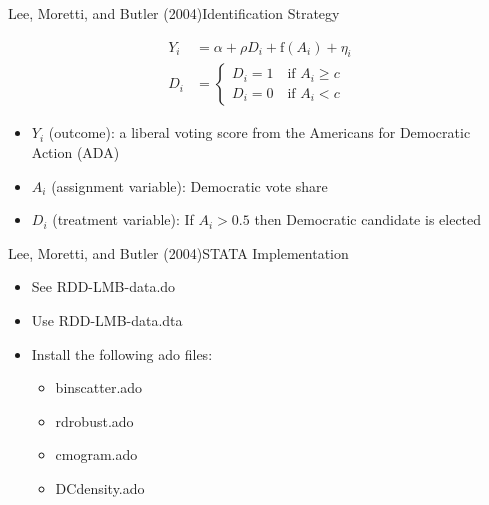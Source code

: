 \documentclass[hyperref={pdfpagelabels=false}]{beamer}
\begin{document}
\begin{frame}{Lee, Moretti, and Butler (2004)}{Identification Strategy}
	
	\begin{equation*}
	\begin{aligned}
	Y_i&=\alpha+\rho D_i+\mathrm{f}(A_i)+\eta_i \\ 
	D_i&=\left\lbrace
	\begin{array}{l}
	D_i=1\quad \text{if $A_i\geq c$}\\
	D_i=0\quad \text{if $A_i<c$}
	\end{array}\right.
	\end{aligned}
	\end{equation*}
	
	
	\begin{itemize}
		\item $Y_{i}$ (outcome): a liberal voting score from the Americans for Democratic Action (ADA)
		\vspace{0.2cm}
		\item $A_{i}$ (assignment variable): Democratic vote share
		\vspace{0.2cm}
		\item $D_{i}$ (treatment variable): If $A_{i}>0.5$ then
		Democratic candidate is elected
	\end{itemize}
\end{frame}



\begin{frame}{Lee, Moretti, and Butler (2004)}{STATA Implementation}
	\begin{itemize}
		\item See RDD-LMB-data.do
		\vspace{0.2cm}
		\item Use RDD-LMB-data.dta
		\vspace{0.2cm}
		\item Install the following ado files:
		\begin{itemize}
			\vspace{0.2cm}
			\item binscatter.ado 
			\item rdrobust.ado 
			\item cmogram.ado
			\item DCdensity.ado
			
		\end{itemize}
		
	\end{itemize}
\end{frame}
\end{document}
